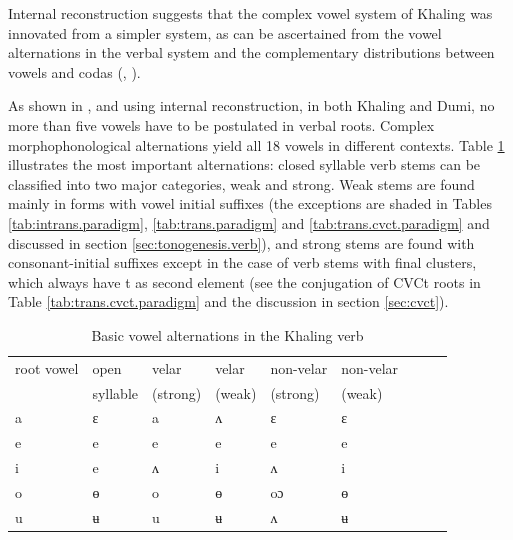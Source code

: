 \documentclass[oldfontcommands,oneside,a4paper,11pt]{article}
\newcommand{\ipa}[1]{{\phon \mbox{#1}}} %
\begin{document}
Internal reconstruction suggests that the complex vowel system of Khaling was innovated from a simpler  system, as can be ascertained from the vowel alternations in the verbal system and the complementary distributions between vowels and codas (\citealt{michailovsky75khaling}, \citealt{jacques12khaling}). 

As shown in \citet{michailovsky75khaling}, \citet{jacques12khaling} and \citet{michailovsky12dumi} using internal reconstruction, in both Khaling and Dumi, no more than five vowels have to be postulated in verbal roots. Complex morphophonological alternations yield all 18 vowels in different contexts. Table \ref{tab:basic.alternations} illustrates  the most important alternations: closed syllable  verb stems can be classified into two major categories, weak and strong. Weak stems are found mainly in forms with vowel initial suffixes (the exceptions are shaded in Tables \ref{tab:intrans.paradigm}, \ref{tab:trans.paradigm} and \ref{tab:trans.cvct.paradigm} and discussed in section \ref{sec:tonogenesis.verb}), and strong stems are  found with consonant-initial suffixes except in the case of verb stems with final clusters, which always have \ipa{t} as second element (see the conjugation of CVCt roots in Table \ref{tab:trans.cvct.paradigm} and the discussion in section \ref{sec:cvct}).

\begin{table}[h]
\caption{Basic vowel alternations in the Khaling verb } \label{tab:basic.alternations} \centering
\begin{tabular}{lllllllll}
\toprule
 root vowel & 	open   & 	velar  & 	velar  & 	non-velar    & 	non-velar   \\
& syllable&(strong) &(weak) &(strong) &(weak) \\
\midrule
\ipa{a}  & 	\ipa{ɛ}  & 	\ipa{a}  & 	\ipa{ʌ}  & 	\ipa{ɛ}  & 	\ipa{ɛ}  \\ 	
\ipa{e}  & 	\ipa{e}  & 	\ipa{e}  & 	\ipa{e}  & 	\ipa{e}  & 	\ipa{e}  \\ 	
\ipa{i}  & 	\ipa{e}  & 	\ipa{ʌ}  & 	\ipa{i}  & 	\ipa{ʌ}  & 	\ipa{i}  \\ 	
\ipa{o}  & 	\ipa{ɵ}  & 	\ipa{o}  & 	\ipa{ɵ}  & 	\ipa{oɔ}  & 	\ipa{ɵ}  \\ 	
\ipa{u}  & 	\ipa{ʉ}  & 	\ipa{u}  & 	\ipa{ʉ}  & 	\ipa{ʌ}  & 	\ipa{ʉ}  \\ 	
\bottomrule
\end{tabular}
\end{table}
\end{document}
